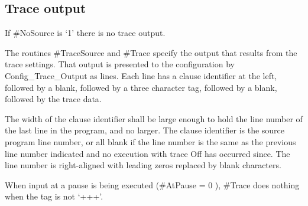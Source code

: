 \hypertarget{trace-output}{%
\subsection{Trace output}\label{trace-output}}

If \#NoSource is `1' there is no trace output.

The routines \#TraceSource and \#Trace specify the output that results
from the trace settings. That output is presented to the configuration
by Config\_Trace\_Output as lines. Each line has a clause identifier at
the left, followed by a blank, followed by a three character tag,
followed by a blank, followed by the trace data.

The width of the clause identifier shall be large enough to hold the
line number of the last line in the program, and no larger. The clause
identifier is the source program line number, or all blank if the line
number is the same as the previous line number indicated and no
execution with trace Off has occurred since. The line number is
right-aligned with leading zeros replaced by blank characters.

When input at a pause is being executed (\#AtPause = 0 ), \#Trace does
nothing when the tag is not `+++'.

